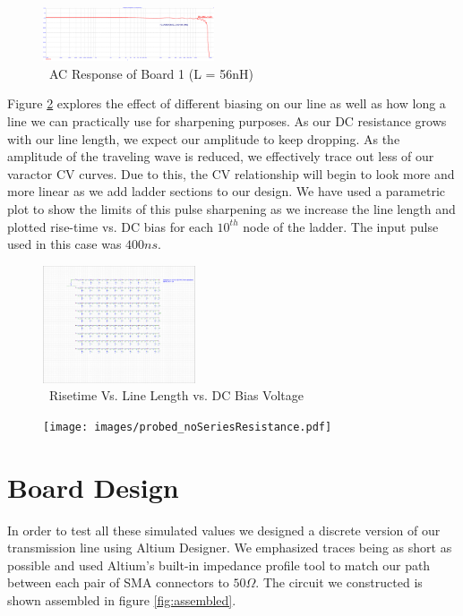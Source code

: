\documentclass[journal]{IEEEtran}
\begin{document}
\begin{figure}[htb]
\centering
\includegraphics[width=0.45\textwidth,page = 1]{ACResponseB1.png}
\caption{\ AC Response of Board 1 (L = 56nH) 
}\label{fig:ACResp56nh}
\end{figure}
 
 Figure \ref{fig:RiseVsLineVsBias} explores the effect of different biasing on our line as well as how long a line we can practically use for sharpening purposes. As our DC resistance grows with our line length, we expect our amplitude to keep dropping. As the amplitude of the traveling wave is reduced, we effectively trace out less of our varactor CV curves. Due to this, the CV relationship will begin to look more and more linear as we add ladder sections to our design. We have used a parametric plot to show the limits of this pulse sharpening as we increase  the line length and plotted rise-time vs. DC bias for each $10^{th}$ node of the ladder. The input pulse used in this case was $400ns$. 

\begin{figure}[htb]
\centering
\includegraphics[width=0.4\textwidth,page = {3}]{RiseTimeVsDCBIASVsLength.pdf}
\caption{\ Risetime Vs. Line Length vs. DC Bias Voltage 
}\label{fig:RiseVsLineVsBias}
\end{figure}


\begin{figure}[htb]
\centering
\texttt{[image: images/probed\_noSeriesResistance.pdf]}
\end{figure}






\section{Board Design} 


In order to test all these simulated values we designed a discrete version of our transmission line using Altium Designer. We emphasized traces being as short as possible and used Altium's built-in impedance profile tool to match our path between each pair of SMA connectors to $50\Omega$. The circuit we constructed is shown assembled in figure \ref{fig:assembled}.
\end{document}
